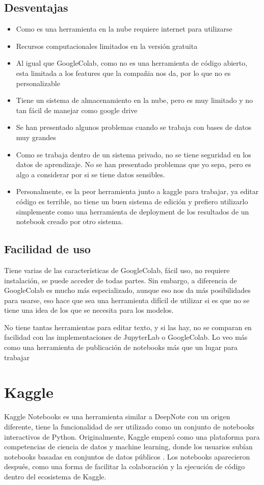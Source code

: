 \documentclass[a4paper,12pt]{article}
\begin{document}
\subsection{Desventajas}
\begin{itemize}
    \item Como es una herramienta en la nube requiere internet para utilizarse
    \item Recursos computacionales limitados en la versión gratuita
    \item Al igual que GoogleColab, como no es una herramienta de código
        abierto, esta limitada a los features que la compañia nos da, por lo que
        no es personalizable
    \item Tiene un sistema de almacenamiento en la nube, pero es muy limitado y
        no tan fácil de manejar como google drive
    \item Se han presentado algunos problemas cuando se trabaja con bases de
        datos muy grandes \cite{medium_comparison_2024}
    \item Como se trabaja dentro de un sistema privado, no se tiene seguridad en
        los datos de aprendizaje. No se han presentado problemas que yo sepa,
        pero es algo a considerar por si se tiene datos sensibles.
    \item Personalmente, es la peor herramienta junto a kaggle para trabajar, ya
        editar código es terrible, no tiene un buen sistema de edición y
        prefiero utilizarlo simplemente como una herramienta de deployment de
        los resultados de un notebook creado por otro sistema.
\end{itemize}
\subsection{Facilidad de uso}
Tiene varias de las características de GoogleColab, fácil uso, no requiere
instalación, se puede acceder de todas partes. Sin embargo, a diferencia de
GoogleColab es mucho más especializado, aunque eso nos da más posibilidades para
usarse, eso hace que sea una herramienta difícil de utilizar si es que no se
tiene una idea de los que se necesita para los modelos.

No tiene tantas herramientas para editar texto, y si las hay, no se comparan en
facilidad con las implementaciones de JupyterLab o GoogleColab. Lo veo más como
una herramienta de publicación de notebooks más que un lugar para trabajar

\section{Kaggle}
Kaggle Notebooks es una herramienta similar a DeepNote con un origen diferente,
tiene la funcionalidad de ser utilizado como un conjunto de notebooks
interactivos de Python. Originalmente,
Kaggle empezó como una plataforma para competencias de ciencia de datos y
machine learning, donde los usuarios subían notebooks basadas en conjuntos de
datos públicos \cite{kaggle_origin}. Los notebooks aparecieron después, como una
forma de facilitar la colaboración y la ejecución de código dentro del
ecosistema de Kaggle.
\end{document}
